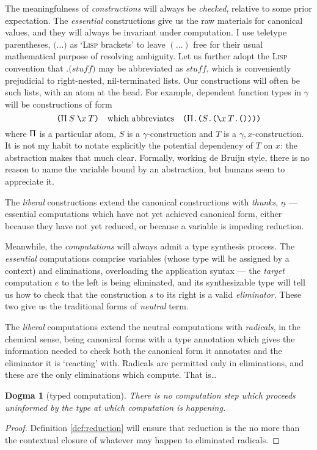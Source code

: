 \documentclass{jfp1}
\newtheorem{dogma}[theorem]{Dogma}
\newcommand{\Pa}[1]{\texttt{(}#1\texttt{)}}
\newcommand{\dt}{\texttt{.}}
\newcommand{\cn}[2]{\Pa{#1 \dt #2}}
\newcommand{\Ne}{\underline}
\begin{document}
\newcommand{\PI}[3]{\Pa{\Uppi\:#1\;\la{#2}{#3}}} 
\newcommand{\SG}[3]{\Pa{\Upsigma\:#1\;\la{#2}{#3}}} 
The meaningfulness of \emph{constructions} will always be
\emph{checked}, relative to some prior expectation. The
\emph{essential} constructions give us the raw materials for
canonical values, and they will always be invariant under computation.
I use teletype parentheses, $\Pa\ldots$ as `\textsc{Lisp} brackets' to leave
$(\ldots)$ free for their usual mathematical purpose of resolving ambiguity.
Let us further adopt the \textsc{Lisp} convention that
$\dt\Pa{\mathit{stuff}}$ may be abbreviated as $\mathit{stuff}$, which is
conveniently prejudicial to right-nested, nil-terminated lists. Our
constructions will often be such lists, with an atom at the head.
For example, dependent function types in $\gamma$ will be constructions of form
\[\PI {S}x{T}\quad
  \mbox{which abbreviates}\quad
  \cn\Uppi{\cn S{\cn{\la x T}{\Pa{}}}}
\]
where $\Uppi$ is a particular atom, $S$ is a $\gamma$-construction and
$T$ is a $\gamma,x$-construction. It is not my habit to notate
explicitly the potential dependency of $T$ on $x$: the abstraction
makes that much clear. Formally, working de Bruijn style, there is no reason
to name the variable bound by an abstraction, but humans seem to appreciate it.

The \emph{liberal} constructions extend the canonical constructions
with \emph{thunks}, $\Ne n$ --- essential computations which have not yet achieved canonical
form, either because they have not yet reduced, or because a variable
is impeding reduction.

Meanwhile, the \emph{computations} will always admit a type synthesis
process. The \emph{essential} computations comprise variables (whose
type will be assigned by a context) and eliminations, overloading the
application syntax --- the \emph{target} computation $e$ to the left is being
eliminated, and its synthesizable
type will tell us how to check that the construction $s$ to its right
is a valid \emph{eliminator}. These two give us the traditional forms
of \emph{neutral} term.

The \emph{liberal} computations extend the neutral computations with
\emph{radicals}, in the chemical sense, being canonical forms with a
type annotation which gives the information needed to check both the
canonical form it annotates and the eliminator it is `reacting' with.
Radicals are permitted only in eliminations, and these are
the only eliminations which compute. That is\ldots

\begin{dogma}[typed computation]
  There is no computation
step which proceeds uninformed by the type at which computation is
happening.
\end{dogma}
\begin{proof}
  Definition \ref{def:reduction} will ensure that reduction is the
  no more than the contextual closure of whatever may happen to
  eliminated radicals.
\end{proof}
\end{document}

